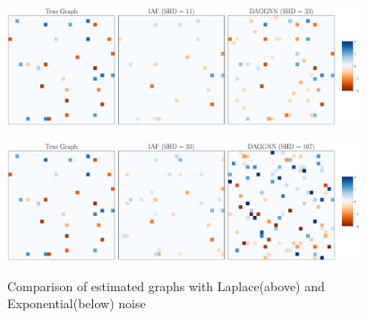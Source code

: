 \documentclass{beamer}
\begin{document}
\begin{frame}
    \begin{figure}
        \centering
        \includegraphics[height=3.5cm]{fig/comparison_indep_30_laplace_seed301.pdf}
        \label{fig:ind_exponential_comparison}
    \end{figure}
    \begin{figure}
        \centering
        \includegraphics[height=3.5cm]{fig/comparison_indep_30_exponential_seed301.pdf}
        \label{fig:ind_exponential_comparison}
        \captionsetup{justification=centering}
        \caption{Comparison of estimated graphs with Laplace(above) and Exponential(below) noise}
    \end{figure}
\end{frame}
\end{document}
